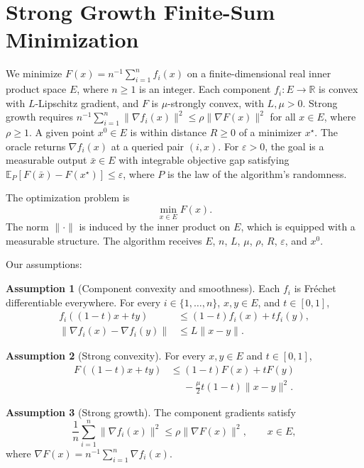 \documentclass[10pt]{article}
\theoremstyle{definition}
\newtheorem{assumption}{Assumption}
\begin{document}
\section*{Strong Growth Finite-Sum Minimization}
We minimize $F(x)=n^{-1}\sum_{i=1}^n f_i(x)$ on a finite-dimensional real inner product space $E$, where $n\geq1$ is an integer. Each component $f_i:E\to\mathbb{R}$ is convex with $L$-Lipschitz gradient, and $F$ is $\mu$-strongly convex, with $L,\mu>0$. Strong growth requires $n^{-1}\sum_{i=1}^n\|\nabla f_i(x)\|^2\leq\rho\|\nabla F(x)\|^2$ for all $x\in E$, where $\rho\geq1$. A given point $x^0\in E$ is within distance $R\geq0$ of a minimizer $x^\star$. The oracle returns $\nabla f_i(x)$ at a queried pair $(i,x)$. For $\varepsilon>0$, the goal is a measurable output $\bar{x}\in E$ with integrable objective gap satisfying $\mathbb{E}_{P}[F(\bar{x})-F(x^\star)]\leq\varepsilon$, where $P$ is the law of the algorithm's randomness.

The optimization problem is
\[
\min_{x\in E} F(x).
\]
The norm $\|\cdot\|$ is induced by the inner product on $E$, which is equipped with a measurable structure. The algorithm receives $E$, $n$, $L$, $\mu$, $\rho$, $R$, $\varepsilon$, and $x^0$.

Our assumptions:
\begin{assumption}[Component convexity and smoothness]
Each $f_i$ is Fr\'echet differentiable everywhere. For every $i\in\{1,\ldots,n\}$, $x,y\in E$, and $t\in[0,1]$,
\[
\begin{aligned}
f_i((1-t)x+ty)&\leq (1-t)f_i(x)+t f_i(y),\\
\|\nabla f_i(x)-\nabla f_i(y)\|&\leq L\|x-y\|.
\end{aligned}
\]
\end{assumption}

\begin{assumption}[Strong convexity]
For every $x,y\in E$ and $t\in[0,1]$,
\[
\begin{aligned}
F((1-t)x+ty)
&\leq (1-t)F(x)+tF(y)\\
&\phantom{{}\leq{}}-\frac{\mu}{2}t(1-t)\|x-y\|^2.
\end{aligned}
\]
\end{assumption}

\begin{assumption}[Strong growth]
The component gradients satisfy
\[
\frac{1}{n}\sum_{i=1}^n\|\nabla f_i(x)\|^2
\leq \rho\|\nabla F(x)\|^2,
\qquad x\in E,
\]
where $\nabla F(x)=n^{-1}\sum_{i=1}^n\nabla f_i(x)$.
\end{assumption}
\end{document}
